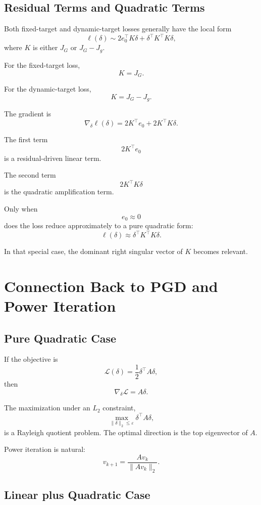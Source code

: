 \documentclass{article}
\begin{document}
\subsection{Residual Terms and Quadratic Terms}

Both fixed-target and dynamic-target losses generally have the local form
\[
    \ell(\delta)
    \sim
    2e_0^\top K\delta
    +
    \delta^\top K^\top K\delta,
\]
where \(K\) is either \(J_G\) or \(J_G-J_g\).

For the fixed-target loss,
\[
    K=J_G.
\]

For the dynamic-target loss,
\[
    K=J_G-J_g.
\]

The gradient is
\[
    \nabla_\delta \ell(\delta)
    =
    2K^\top e_0+2K^\top K\delta.
\]

The first term
\[
    2K^\top e_0
\]
is a residual-driven linear term.

The second term
\[
    2K^\top K\delta
\]
is the quadratic amplification term.

Only when
\[
    e_0\approx 0
\]
does the loss reduce approximately to a pure quadratic form:
\[
    \ell(\delta)
    \approx
    \delta^\top K^\top K\delta.
\]

In that special case, the dominant right singular vector of \(K\) becomes relevant.

\section{Connection Back to PGD and Power Iteration}

\subsection{Pure Quadratic Case}

If the objective is
\[
    \mathcal L(\delta)=\frac{1}{2}\delta^\top A\delta,
\]
then
\[
    \nabla_\delta \mathcal L=A\delta.
\]

The maximization under an \(L_2\) constraint,
\[
    \max_{\|\delta\|_2\le \varepsilon}\delta^\top A\delta,
\]
is a Rayleigh quotient problem. The optimal direction is the top eigenvector of \(A\).

Power iteration is natural:
\[
    v_{k+1}
    =
    \frac{A v_k}{\|A v_k\|_2}.
\]

\subsection{Linear plus Quadratic Case}
\end{document}
